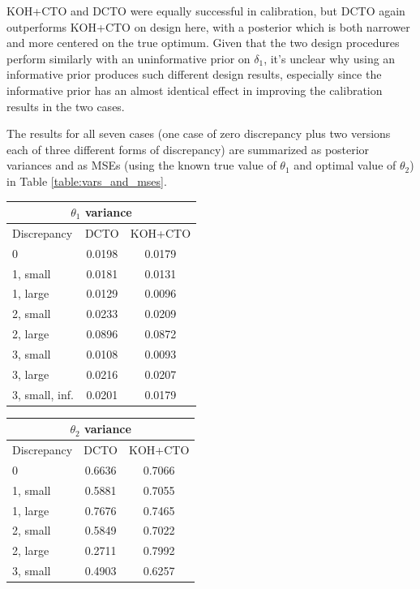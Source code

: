 \documentclass[12pt]{article}
\begin{document}
%
KOH+CTO and DCTO were equally successful in calibration, but DCTO again outperforms KOH+CTO on design here, with a posterior which is both narrower and more centered on the true optimum.
%
Given that the two design procedures perform similarly with an uninformative prior on $\delta_1$, it's unclear why using an informative prior produces such different design results, especially since the informative prior has an almost identical effect in improving the calibration results in the two cases.
%


%
The results for all seven cases (one case of zero discrepancy plus two versions each of three different forms of discrepancy) are summarized as posterior variances and as MSEs (using the known true value of $\theta_1$ and optimal value of $\theta_2$) in Table \ref{table:vars_and_mses}.
%
\begin{table}[]
\centering
\begin{tabular}{lcc}
\multicolumn{3}{c}{$\theta_1$ variance} \\ \hline
Discrepancy    & DCTO   & KOH+CTO    \\ \hline
0              & 0.0198 & 0.0179 \\ \hline
1, small       & 0.0181 & 0.0131 \\ \hline
1, large       & 0.0129 & 0.0096 \\ \hline
2, small       & 0.0233 & 0.0209 \\ \hline
2, large       & 0.0896 & 0.0872 \\ \hline
3, small       & 0.0108 & 0.0093 \\ \hline
3, large       & 0.0216 & 0.0207 \\ \hline
3, small, inf. & 0.0201 & 0.0179 \\ \hline
\end{tabular}
\hspace{.5in}
\begin{tabular}{lcc}
\multicolumn{3}{c}{$\theta_2$ variance} \\ \hline
Discrepancy     & DCTO    & KOH+CTO    \\ \hline
0               & 0.6636  & 0.7066 \\ \hline
1, small        & 0.5881  & 0.7055 \\ \hline
1, large        & 0.7676  & 0.7465 \\ \hline
2, small        & 0.5849  & 0.7022 \\ \hline
2, large        & 0.2711  & 0.7992 \\ \hline
3, small        & 0.4903  & 0.6257 \\ \hline

\end{tabular}
\end{table}
\end{document}
